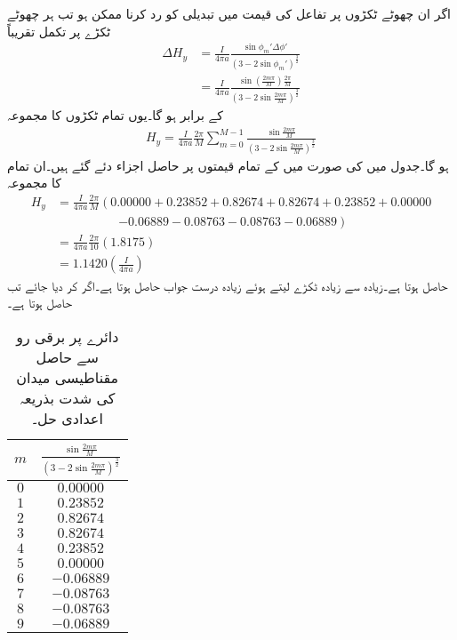اگر ان چھوٹے ٹکڑوں پر تفاعل کی قیمت میں تبدیلی کو رد کرنا ممکن ہو تب ہر چھوٹے ٹکڑے پر تکمل تقریباً
\begin{align*}
\Delta H_y&=\frac{I}{4\pi a} \frac{\sin \phi_m' \Delta \phi'}{\left(3-2\sin \phi_m'\right)^{\frac{3}{2}}} \\
&=\frac{I}{4\pi a} \frac{\sin (\frac{2 m \pi}{M}) \frac{2\pi}{M}}{\left(3-2\sin   \frac{2 m \pi}{M}\right)^{\frac{3}{2}}} 
\end{align*}
کے برابر ہو گا۔یوں تمام ٹکڑوں کا مجموعہ
\begin{align*}
H_y= \frac{I}{4\pi a} \frac{2\pi}{M} \sum_{m=0}^{M-1}\frac{\sin  \frac{2 m \pi}{M} }{\left(3-2\sin  \frac{2 m \pi}{M}\right)^{\frac{3}{2}}}
\end{align*}
ہو گا۔جدول  میں  کی صورت میں  کے تمام قیمتوں پر حاصل   اجزاء دئے گئے ہیں۔ان تمام کا مجموعہ
\begin{align*}
H_y&=\frac{I}{4\pi a} \frac{2\pi}{M} \left(0.00000+0.23852 +  0.82674 +  0.82674  + 0.23852  + 0.00000 \right.  \\
& \quad \quad \quad \quad \quad \left.-0.06889  -0.08763  -0.08763  -0.06889\right)\\
&=\frac{I}{4\pi a}\frac{2\pi}{10} (1.8175)\\
&=1.1420 \left(\frac{ I}{4\pi a}\right)
\end{align*}
حاصل ہوتا ہے۔زیادہ سے زیادہ ٹکڑے لیتے ہوئے زیادہ درست جواب حاصل ہوتا ہے۔اگر  کر دیا جائے تب   حاصل ہوتا ہے۔
\begin{table}
\centering
\begin{tabular}{c c}
$m$& $\frac{\sin  \frac{2 m \pi}{M}}{\left(3-2\sin  \frac{2 m \pi}{M}\right)^{\frac{3}{2}}}$\\[3ex]
\hline
$0$& $0.00000$\\
$1$& $0.23852$\\
$2$&$0.82674 $\\
$3$& $0.82674$\\
$4$& $0.23852$\\
$5$& $0.00000$\\
$6$& $-0.06889$\\
$7$&$-0.08763$\\
$8$& $ -0.08763$\\
$9$& $-0.06889$
\end{tabular}
\caption{دائرے پر برقی رو سے حاصل مقناطیسی میدان کی شدت بذریعہ اعدادی حل۔}
\label{جدول_مقناطیسی_دائرہ_مقناطیسی_شدت_عددی_حل}
\end{table}

